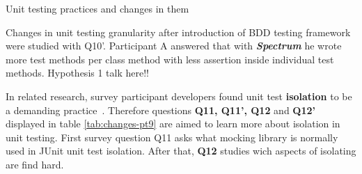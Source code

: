     \begin{table}[H]
             \caption {Unit testing practices and changes in them} \label{tab:changes-pt8}
     \end{table}

Changes in unit testing granularity after introduction of BDD testing framework were studied with Q10'. Participant A
answered that with \textbf{\textit{Spectrum}} he wrote more test methods per class method with less assertion inside individual
test methods. Hypothesis 1 talk here!!

\clearpage

In related research, survey participant developers found unit test \textbf{isolation} to be a demanding practice~\cite{daka2014survey}.
Therefore questions \textbf{Q11, Q11', Q12} and \textbf{Q12'} displayed in table \ref{tab:changes-pt9} are aimed to learn more about isolation in unit testing.
First survey question Q11 asks what mocking library is normally used in JUnit unit test isolation. After that,
\textbf{Q12} studies wich aspects of isolating are find hard.

